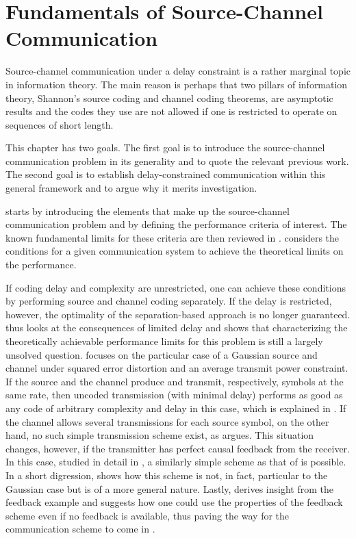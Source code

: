 \chapter{Fundamentals of Source-Channel Communication}\label{ch:fundamentals}

Source-channel communication under a delay constraint is a rather marginal topic
in information theory. The main reason is perhaps that two pillars of
information theory, Shannon's source coding and channel coding theorems, are
asymptotic results and the codes they use are not allowed if one is restricted
to operate on sequences of short length. 

This chapter has two goals. The first goal is to introduce the source-channel
communication problem in its generality and to quote the relevant previous work.
The second goal is to establish delay-constrained communication within this
general framework and to argue why it merits investigation. 

 starts by introducing the elements that make up the
source-channel communication problem and by defining the performance criteria of
interest. The known fundamental limits for these criteria are then reviewed in
.   considers the
conditions for a given communication system to achieve the theoretical limits on
the performance. 

If coding delay and complexity are unrestricted, one can achieve these
conditions by performing source and channel coding separately. If the delay is
restricted, however, the optimality of the separation-based approach is no
longer guaranteed.  thus looks at the consequences of
limited delay and shows that characterizing the theoretically achievable
performance limits for this problem is still a largely unsolved question.
 focuses on the particular case of a Gaussian source and
channel under squared error distortion and an average transmit power constraint.
If the source and the channel produce and transmit, respectively, symbols at the
same rate, then uncoded transmission (with minimal delay) performs as good as
any code of arbitrary complexity and delay in this case, which is explained in
. If the channel allows several transmissions for each
source symbol, on the other hand, no such simple transmission scheme exist, as
 argues. This situation changes, however, if the transmitter
has perfect causal feedback from the receiver. In this case, studied in detail
in , a similarly simple scheme as that of
 is possible. In a short digression, 
shows how this scheme is not, in fact, particular to the Gaussian case but is of
a more general nature. Lastly,  derives insight from
the feedback example and suggests how one could use the properties of the
feedback scheme even if no feedback is available, thus paving the way for the
communication scheme to come in . 


